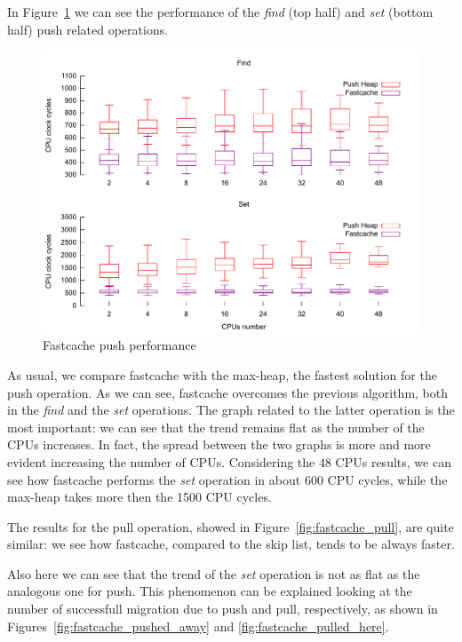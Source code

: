 In Figure~\ref{fig:fastcache_push} we can see the performance of
the \emph{find} (top half) and \emph{set} (bottom half) push related
operations.

\begin{figure}[htbp]
    \includegraphics[width=\columnwidth]{images/fastcache_push}
    \caption{Fastcache push performance}
    \label{fig:fastcache_push}
\end{figure}

As usual, we compare fastcache with the max-heap, the fastest solution
for the push operation. As we can see, fastcache overcomes the previous
algorithm, both in the \emph{find} and the \emph{set} operations. The graph related
to the latter operation is the most important: we can see that the trend
remains flat as the number of the CPUs increases. In fact, the spread
between the two graphs is more and more evident increasing the number
of CPUs. Considering the 48 CPUs results, we can see how fastcache
performs the \emph{set} operation in about 600 CPU cycles, while the max-heap
takes more then the 1500 CPU cycles.

The results for the pull operation, showed in Figure~\ref{fig:fastcache_pull},
are quite similar: we see how fastcache, compared to the skip list, 
tends to be always faster.

Also here we can see that the trend of the \emph{set} operation is not 
as flat as the analogous one for push. This phenomenon can be explained 
looking at the number of successfull migration due to push and pull, 
respectively, as shown in Figures~\ref{fig:fastcache_pushed_away} and 
\ref{fig:fastcache_pulled_here}.

